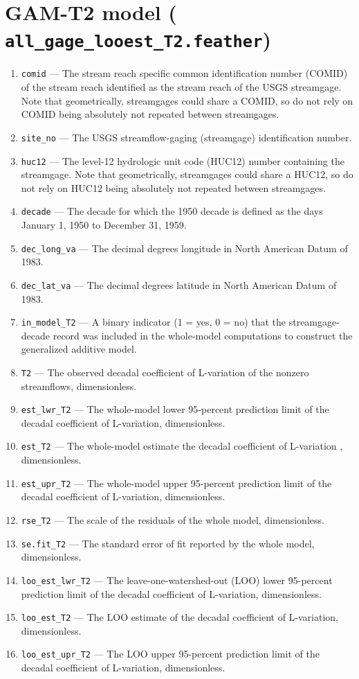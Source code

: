 \documentclass[1p, authoryear, 11pt, times, preprint]{elsarticle}
\newcommand{\code}[1]{{\color{black}%
                       \mbox{\lstinline[basicstyle={\small\ttfamily},
                                        keywordstyle=\scriptsize\ttfamily]|#1|}}}
\begin{document}
\section{GAM-T2 model (\code{all_gage_looest_T2.feather})}
\begin{enumerate}
\footnotesize
\RaggedRight
\item \code{comid} --- The stream reach specific common identification number (COMID) of the stream reach identified as the stream reach of the USGS streamgage. Note that geometrically, streamgages could share a COMID, so do not rely on COMID being absolutely not repeated between streamgages.
\item \code{site_no} --- The USGS streamflow-gaging (streamgage) identification number.
\item \code{huc12} --- The level-12 hydrologic unit code (HUC12) number containing the streamgage. Note that geometrically, streamgages could share a HUC12, so do not rely on HUC12 being absolutely not repeated between streamgages.
\item \code{decade} --- The decade for which the 1950 decade is defined as the days January 1, 1950 to December 31, 1959.
\item \code{dec_long_va} --- The decimal degrees longitude in North American Datum of 1983.
\item \code{dec_lat_va} --- The decimal degrees latitude in North American Datum of 1983.
\item \code{in_model_T2} --- A binary indicator (1 = yes, 0 = no) that the streamgage-decade record was included in the whole-model computations to construct the generalized additive model.
\item \code{T2} --- The observed decadal coefficient of L-variation of the nonzero streamflows, dimensionless.
\item \code{est_lwr_T2} --- The whole-model lower 95-percent prediction limit of the decadal coefficient of L-variation, dimensionless.
\item \code{est_T2} --- The whole-model estimate the decadal coefficient of L-variation , dimensionless.
\item \code{est_upr_T2} --- The whole-model upper 95-percent prediction limit of the decadal coefficient of L-variation, dimensionless.
\item \code{rse_T2} --- The scale of the residuals of the whole model, dimensionless.
\item \code{se.fit_T2} --- The standard error of fit reported by the whole model, dimensionless.
\item \code{loo_est_lwr_T2} --- The leave-one-watershed-out (LOO) lower 95-percent prediction limit of the decadal coefficient of L-variation, dimensionless.
\item \code{loo_est_T2} --- The LOO estimate of the decadal coefficient of L-variation, dimensionless.
\item \code{loo_est_upr_T2} --- The LOO upper 95-percent prediction limit of the decadal coefficient of L-variation, dimensionless.
\end{enumerate}
\end{document}

